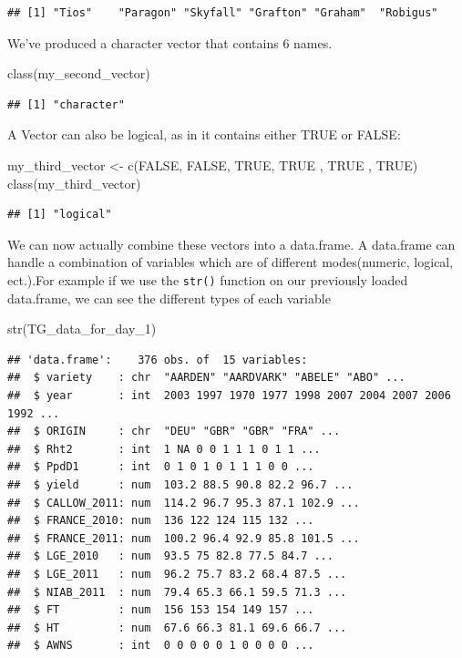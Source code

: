 \documentclass[
]{book}
\newenvironment{Shaded}{\begin{snugshade}}{\end{snugshade}}
\newcommand{\ConstantTok}[1]{\textcolor[rgb]{0.00,0.00,0.00}{#1}}
\newcommand{\FunctionTok}[1]{\textcolor[rgb]{0.00,0.00,0.00}{#1}}
\newcommand{\NormalTok}[1]{#1}
\newcommand{\OtherTok}[1]{\textcolor[rgb]{0.56,0.35,0.01}{#1}}
\begin{document}
\begin{verbatim}
## [1] "Tios"    "Paragon" "Skyfall" "Grafton" "Graham"  "Robigus"
\end{verbatim}

We've produced a character vector that contains 6 names.

\begin{Shaded}
\begin{Highlighting}[]
\FunctionTok{class}\NormalTok{(my\_second\_vector)}
\end{Highlighting}
\end{Shaded}

\begin{verbatim}
## [1] "character"
\end{verbatim}

A Vector can also be logical, as in it contains either TRUE or FALSE:

\begin{Shaded}
\begin{Highlighting}[]
\NormalTok{my\_third\_vector }\OtherTok{\textless{}{-}} \FunctionTok{c}\NormalTok{(}\ConstantTok{FALSE}\NormalTok{, }\ConstantTok{FALSE}\NormalTok{, }\ConstantTok{TRUE}\NormalTok{, }\ConstantTok{TRUE}\NormalTok{ , }\ConstantTok{TRUE}\NormalTok{ , }\ConstantTok{TRUE}\NormalTok{)}
\FunctionTok{class}\NormalTok{(my\_third\_vector)}
\end{Highlighting}
\end{Shaded}

\begin{verbatim}
## [1] "logical"
\end{verbatim}

We can now actually combine these vectors into a data.frame. A data.frame can handle a combination of variables which are of different modes(numeric, logical, ect.).For example if we use the \texttt{str()} function on our previously loaded data.frame, we can see the different types of each variable

\begin{Shaded}
\begin{Highlighting}[]
\FunctionTok{str}\NormalTok{(TG\_data\_for\_day\_1)}
\end{Highlighting}
\end{Shaded}

\begin{verbatim}
## 'data.frame':    376 obs. of  15 variables:
##  $ variety    : chr  "AARDEN" "AARDVARK" "ABELE" "ABO" ...
##  $ year       : int  2003 1997 1970 1977 1998 2007 2004 2007 2006 1992 ...
##  $ ORIGIN     : chr  "DEU" "GBR" "GBR" "FRA" ...
##  $ Rht2       : int  1 NA 0 0 1 1 1 0 1 1 ...
##  $ PpdD1      : int  0 1 0 1 0 1 1 1 0 0 ...
##  $ yield      : num  103.2 88.5 90.8 82.2 96.7 ...
##  $ CALLOW_2011: num  114.2 96.7 95.3 87.1 102.9 ...
##  $ FRANCE_2010: num  136 122 124 115 132 ...
##  $ FRANCE_2011: num  100.2 96.4 92.9 85.8 101.5 ...
##  $ LGE_2010   : num  93.5 75 82.8 77.5 84.7 ...
##  $ LGE_2011   : num  96.2 75.7 83.2 68.4 87.5 ...
##  $ NIAB_2011  : num  79.4 65.3 66.1 59.5 71.3 ...
##  $ FT         : num  156 153 154 149 157 ...
##  $ HT         : num  67.6 66.3 81.1 69.6 66.7 ...
##  $ AWNS       : int  0 0 0 0 0 1 0 0 0 0 ...
\end{verbatim}
\end{document}

